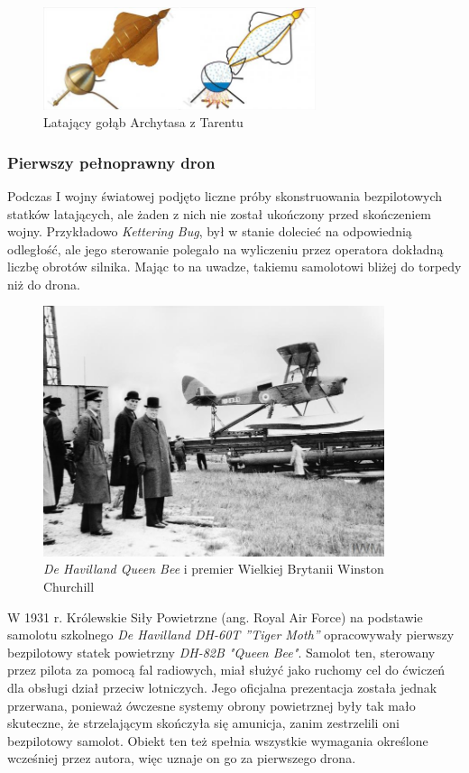 \begin{figure}[!ht]
  \centering
  \includegraphics[width=8cm]{./Obrazy/golab.jpg}
  \caption{Latający gołąb Archytasa z Tarentu}
  \end{figure}

\subsubsection{Pierwszy pełnoprawny dron}
Podczas I wojny światowej podjęto liczne próby skonstruowania bezpilotowych statków latających, ale żaden z nich nie został ukończony przed skończeniem wojny. Przykładowo \textit{Kettering Bug}, był w stanie dolecieć na odpowiednią odległość, ale jego sterowanie polegało na wyliczeniu przez operatora dokładną liczbę obrotów silnika. Mając to na uwadze, takiemu samolotowi bliżej do torpedy niż do drona. 

\begin{figure}[ht!]
  \centering
  \includegraphics[width=10cm]{./Obrazy/queen-bee.jpg}
  \caption{\textit{De Havilland Queen Bee} i premier Wielkiej Brytanii Winston Churchill}
  \end{figure}

W 1931 r. Królewskie Siły Powietrzne (ang. Royal Air Force) na podstawie samolotu szkolnego \textit{De Havilland DH-60T ”Tiger Moth”} opracowywały pierwszy bezpilotowy statek powietrzny \textit{DH-82B "Queen Bee"}.  Samolot ten, sterowany przez pilota za pomocą fal radiowych, miał służyć jako ruchomy cel do ćwiczeń dla obsługi dział przeciw lotniczych. Jego oficjalna prezentacja została jednak przerwana, ponieważ ówczesne systemy obrony powietrznej były tak mało skuteczne, że strzelającym skończyła się amunicja, zanim zestrzelili oni bezpilotowy samolot. Obiekt ten też spełnia wszystkie wymagania określone wcześniej przez autora, więc uznaje on go za pierwszego drona.

